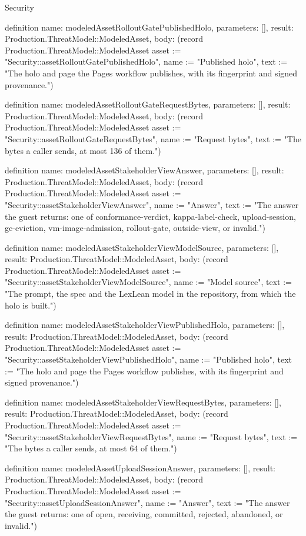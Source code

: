 \begin{lexlean}{Security}
\begin{semanticmodule}
definition{
  name: modeledAssetRolloutGatePublishedHolo,
  parameters: [],
  result: Production.ThreatModel::ModeledAsset,
  body: (record Production.ThreatModel::ModeledAsset {asset := "Security::assetRolloutGatePublishedHolo", name := "Published holo", text := "The holo and page the Pages workflow publishes, with its fingerprint and signed provenance."})
}

definition{
  name: modeledAssetRolloutGateRequestBytes,
  parameters: [],
  result: Production.ThreatModel::ModeledAsset,
  body: (record Production.ThreatModel::ModeledAsset {asset := "Security::assetRolloutGateRequestBytes", name := "Request bytes", text := "The bytes a caller sends, at most 136 of them."})
}

definition{
  name: modeledAssetStakeholderViewAnswer,
  parameters: [],
  result: Production.ThreatModel::ModeledAsset,
  body: (record Production.ThreatModel::ModeledAsset {asset := "Security::assetStakeholderViewAnswer", name := "Answer", text := "The answer the guest returns: one of conformance-verdict, kappa-label-check, upload-session, gc-eviction, vm-image-admission, rollout-gate, outside-view, or invalid."})
}

definition{
  name: modeledAssetStakeholderViewModelSource,
  parameters: [],
  result: Production.ThreatModel::ModeledAsset,
  body: (record Production.ThreatModel::ModeledAsset {asset := "Security::assetStakeholderViewModelSource", name := "Model source", text := "The prompt, the spec and the LexLean model in the repository, from which the holo is built."})
}

definition{
  name: modeledAssetStakeholderViewPublishedHolo,
  parameters: [],
  result: Production.ThreatModel::ModeledAsset,
  body: (record Production.ThreatModel::ModeledAsset {asset := "Security::assetStakeholderViewPublishedHolo", name := "Published holo", text := "The holo and page the Pages workflow publishes, with its fingerprint and signed provenance."})
}

definition{
  name: modeledAssetStakeholderViewRequestBytes,
  parameters: [],
  result: Production.ThreatModel::ModeledAsset,
  body: (record Production.ThreatModel::ModeledAsset {asset := "Security::assetStakeholderViewRequestBytes", name := "Request bytes", text := "The bytes a caller sends, at most 64 of them."})
}

definition{
  name: modeledAssetUploadSessionAnswer,
  parameters: [],
  result: Production.ThreatModel::ModeledAsset,
  body: (record Production.ThreatModel::ModeledAsset {asset := "Security::assetUploadSessionAnswer", name := "Answer", text := "The answer the guest returns: one of open, receiving, committed, rejected, abandoned, or invalid."})
}


\end{semanticmodule}
\end{lexlean}
